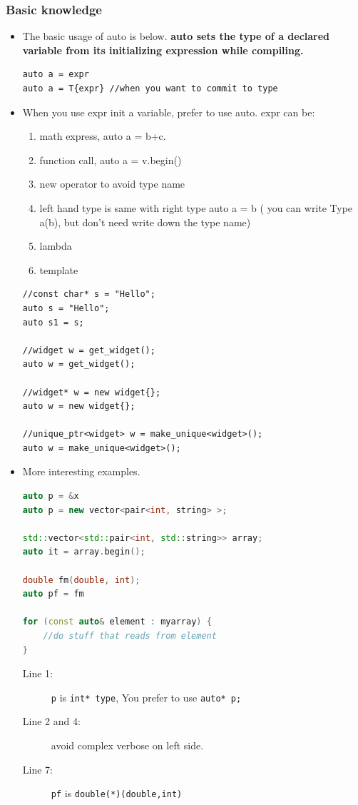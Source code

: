 \documentclass[a4paper,11pt,twoside]{book}
\begin{document}
\subsubsection{Basic knowledge}
\begin{itemize}
	\item The basic usage of auto is below. \textbf{auto sets the type of a declared variable from its initializing expression while compiling.}
\begin{lstlisting}[numbers=none]
auto a = expr
auto a = T{expr} //when you want to commit to type
\end{lstlisting}


	\item When you use expr init a variable, prefer to use auto. expr can be:
\begin{enumerate}
	\item math express, auto a = b+c.
	\item function call, auto a = v.begin()
	\item new operator to avoid type name
	\item left hand type is same with right type auto a = b ( you can write Type a(b), but don't need write down the type name)
	\item lambda
	\item template 
\end{enumerate}
\begin{lstlisting}[numbers=none]
//const char* s = "Hello";             
auto s = "Hello";
auto s1 = s;

//widget w = get_widget();             
auto w = get_widget();

//widget* w = new widget{};    
auto w = new widget{}; 

//unique_ptr<widget> w = make_unique<widget>();
auto w = make_unique<widget>();
\end{lstlisting}

	\item More interesting examples.
	
\begin{lstlisting}[frame=single, language=c++]
auto p = &x  
auto p = new vector<pair<int, string> >;

std::vector<std::pair<int, std::string>> array;
auto it = array.begin();    
     
double fm(double, int);
auto pf = fm          

for (const auto& element : myarray) {
	//do stuff that reads from element
}
\end{lstlisting}
\begin{description}
	\item[Line 1:] \texttt{p} is \texttt{int* type}, You prefer to use \texttt{auto* p;}
	\item[Line 2 and 4:] avoid complex verbose on left side.
	\item[Line 7:] \texttt{pf} is \texttt{double(*)(double,int)}
\end{description}
	

\end{itemize}
\end{document}
